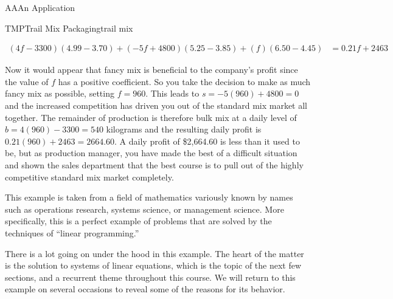 \begin{subsect}{AA}{An Application}
\begin{example}{TMP}{Trail Mix Packaging}{trail mix}
\begin{para}
%
\begin{align*}
(4f-3300)(4.99-3.70)+(-5f+4800)(5.25-3.85)+(f)(6.50-4.45)&=0.21f+2463
\end{align*}
\end{para}
%
\begin{para}Now it would appear that fancy mix is beneficial to the company's profit since the value of $f$ has a positive coefficient.  So you take the decision to make as much fancy mix as possible, setting $f=960$.  This leads to $s=-5(960)+4800=0$ and the increased competition has driven you out of the standard mix market all together.  The remainder of production is therefore bulk mix at a daily level of $b=4(960)-3300=540$ kilograms and the resulting daily profit is $0.21(960)+2463=2664.60$.  A daily profit of \$2,664.60 is less than it used to be, but as production manager, you have made the best of a difficult situation and shown the sales department that the best course is to pull out of the highly competitive standard mix market completely.\end{para}
%
\end{example}
%
\begin{para}This example is taken from a field of mathematics variously known by names such as operations research, systems science, or management science.  More specifically, this is a perfect example of problems that are solved by the techniques of ``linear programming.''\end{para}
%
\begin{para}There is a lot going on under the hood in this example.  The heart of the matter is the solution to systems of linear equations, which is the topic of the next few sections, and a recurrent theme throughout this course.  We will return to this example on several occasions to reveal some of the reasons for its behavior.\end{para}
%
\end{subsect}
%
